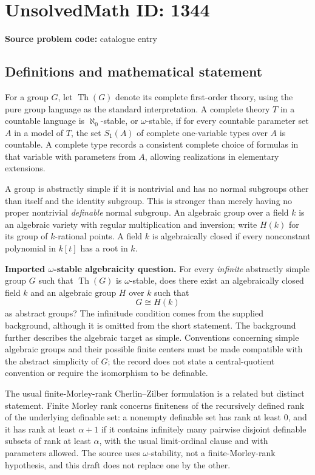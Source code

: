 \documentclass[11pt]{article}
\begin{document}
\section*{UnsolvedMath ID: 1344}
\textbf{Source problem code:} catalogue entry
\subsection{Definitions and mathematical statement}
For a group $G$, let $\operatorname{Th}(G)$ denote its complete first-order theory, using the pure group language as the standard interpretation. A complete theory $T$ in a countable language is $\aleph_0$-stable, or $\omega$-stable, if for every countable parameter set $A$ in a model of $T$, the set $S_1(A)$ of complete one-variable types over $A$ is countable. A complete type records a consistent complete choice of formulas in that variable with parameters from $A$, allowing realizations in elementary extensions.

A group is abstractly simple if it is nontrivial and has no normal subgroups other than itself and the identity subgroup. This is stronger than merely having no proper nontrivial \emph{definable} normal subgroup. An algebraic group over a field $k$ is an algebraic variety with regular multiplication and inversion; write $H(k)$ for its group of $k$-rational points. A field $k$ is algebraically closed if every nonconstant polynomial in $k[t]$ has a root in $k$.

\textbf{Imported $\omega$-stable algebraicity question.} For every \emph{infinite} abstractly simple group $G$ such that $\operatorname{Th}(G)$ is $\omega$-stable, does there exist an algebraically closed field $k$ and an algebraic group $H$ over $k$ such that
\[
 G\cong H(k)
\]
 as abstract groups? The infinitude condition comes from the supplied background, although it is omitted from the short statement. The background further describes the algebraic target as simple. Conventions concerning simple algebraic groups and their possible finite centers must be made compatible with the abstract simplicity of $G$; the record does not state a central-quotient convention or require the isomorphism to be definable.

The usual finite-Morley-rank Cherlin--Zilber formulation is a related but distinct statement. Finite Morley rank concerns finiteness of the recursively defined rank of the underlying definable set: a nonempty definable set has rank at least $0$, and it has rank at least $\alpha+1$ if it contains infinitely many pairwise disjoint definable subsets of rank at least $\alpha$, with the usual limit-ordinal clause and with parameters allowed. The source uses $\omega$-stability, not a finite-Morley-rank hypothesis, and this draft does not replace one by the other.
\end{document}
